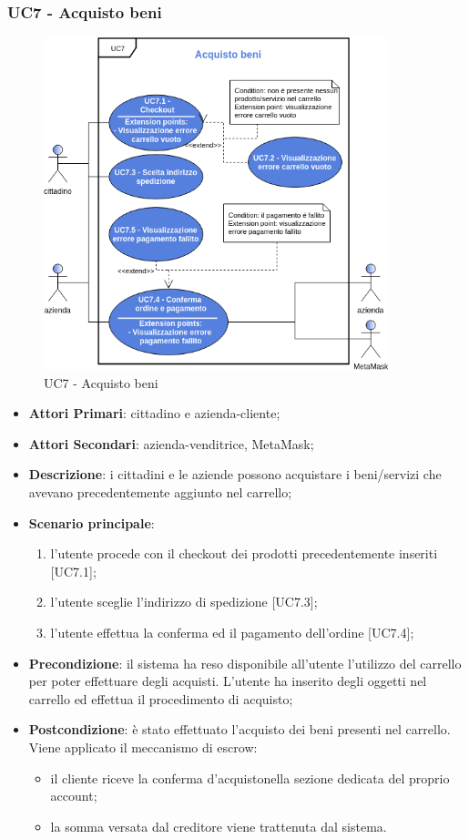\subsubsection{UC7 - Acquisto beni}
\begin{figure}[h]
	\includegraphics[width=10cm]{res/images/UC7-Generale.png}
	\centering
	\caption{UC7 - Acquisto beni}
\end{figure}
\begin{itemize}
	\item \textbf{Attori Primari}: cittadino e azienda-cliente;
	\item \textbf{Attori Secondari}: azienda-venditrice, MetaMask\glo;
	\item \textbf{Descrizione}: i cittadini e le aziende possono acquistare i beni/servizi che avevano precedentemente aggiunto nel carrello;
	\item \textbf{Scenario principale}: 
	\begin{enumerate}[label=\alph*.]
		\item l'utente procede con il checkout dei prodotti precedentemente inseriti [UC7.1];
		\item l'utente sceglie l'indirizzo di spedizione [UC7.3];
		\item l'utente effettua la conferma ed il pagamento dell'ordine [UC7.4];
	\end{enumerate}
	
	\item \textbf{Precondizione}: il sistema ha reso disponibile all'utente l'utilizzo del carrello per poter effettuare degli acquisti. L'utente ha inserito degli oggetti nel carrello ed effettua il procedimento di acquisto;
	\item \textbf{Postcondizione}: è stato effettuato l'acquisto dei beni presenti nel carrello. Viene applicato il meccanismo di escrow\glo: 
	\begin{itemize}
		\item il cliente riceve la conferma d'acquisto\glosp nella sezione dedicata del proprio account;
		\item la somma versata dal creditore viene trattenuta dal sistema.
	\end{itemize} 
\end{itemize} 
